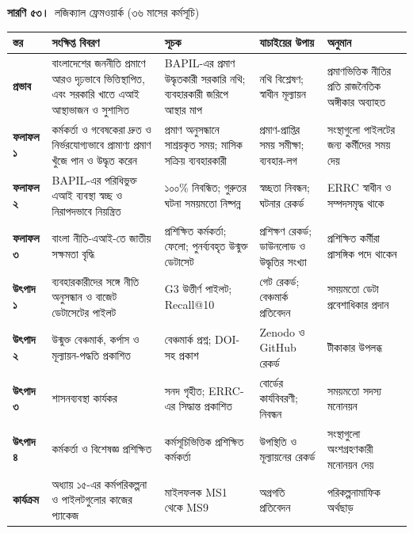 \documentclass[border=10pt]{standalone}
\begin{document}
\begin{minipage}{17cm}
{\large\bfseries সারণি ৫৩।}\ {\large লজিক্যাল ফ্রেমওয়ার্ক (৩৬ মাসের কর্মসূচি)}\par\vspace{7pt}
\small
{}
\begin{tabularx}{\linewidth}{@{}>{\hsize=0.592\hsize\raggedright\arraybackslash}X>{\hsize=1.232\hsize\raggedright\arraybackslash}X>{\hsize=1.232\hsize\raggedright\arraybackslash}X>{\hsize=0.900\hsize\raggedright\arraybackslash}X>{\hsize=1.043\hsize\raggedright\arraybackslash}X@{}}
\arrayrulecolor{bapilrule}\toprule
\rowcolor{white}\textbf{স্তর} & \textbf{সংক্ষিপ্ত বিবরণ} & \textbf{সূচক} & \textbf{যাচাইয়ের উপায়} & \textbf{অনুমান} \\
\midrule
\textbf{প্রভাব} & বাংলাদেশের জননীতি প্রমাণে আরও দৃঢ়ভাবে ভিত্তিস্থাপিত, এবং সরকারি খাতে এআই আস্থাভাজন ও সুশাসিত & BAPIL-এর প্রমাণ উদ্ধৃতকারী সরকারি নথি; ব্যবহারকারী জরিপে আস্থার মাপ & নথি বিশ্লেষণ; স্বাধীন মূল্যায়ন & প্রমাণভিত্তিক নীতির প্রতি রাজনৈতিক অঙ্গীকার অব্যাহত \\
\textbf{ফলাফল ১} & কর্মকর্তা ও গবেষকেরা দ্রুত ও নির্ভরযোগ্যভাবে প্রামাণ্য প্রমাণ খুঁজে পান ও উদ্ধৃত করেন & প্রমাণ অনুসন্ধানে সাশ্রয়কৃত সময়; মাসিক সক্রিয় ব্যবহারকারী & প্রমাণ-প্রাপ্তির সময় সমীক্ষা; ব্যবহার-লগ & সংস্থাগুলো পাইলটের জন্য কর্মীদের সময় দেয় \\
\textbf{ফলাফল ২} & BAPIL-এর পরিধিভুক্ত এআই ব্যবস্থা স্বচ্ছ ও নিরাপদভাবে নিয়ন্ত্রিত & ১০০\% নিবন্ধিত; গুরুতর ঘটনা সময়মতো নিষ্পন্ন & স্বচ্ছতা নিবন্ধন; ঘটনার রেকর্ড & ERRC স্বাধীন ও সম্পদসমৃদ্ধ থাকে \\
\textbf{ফলাফল ৩} & বাংলা নীতি-এআই-তে জাতীয় সক্ষমতা বৃদ্ধি & প্রশিক্ষিত কর্মকর্তা; ফেলো; পুনর্ব্যবহৃত উন্মুক্ত ডেটাসেট & প্রশিক্ষণ রেকর্ড; ডাউনলোড ও উদ্ধৃতির সংখ্যা & প্রশিক্ষিত কর্মীরা প্রাসঙ্গিক পদে থাকেন \\
\textbf{উৎপাদ ১} & ব্যবহারকারীদের সঙ্গে নীতি অনুসন্ধান ও বাজেট ডেটাসেটের পাইলট & G3 উত্তীর্ণ পাইলট; Recall@10 & গেট রেকর্ড; বেঞ্চমার্ক প্রতিবেদন & সময়মতো ডেটা প্রবেশাধিকার প্রদান \\
\textbf{উৎপাদ ২} & উন্মুক্ত বেঞ্চমার্ক, কর্পাস ও মূল্যায়ন-পদ্ধতি প্রকাশিত & বেঞ্চমার্ক প্রশ্ন; DOI-সহ প্রকাশ & Zenodo ও GitHub রেকর্ড & টীকাকার উপলব্ধ \\
\textbf{উৎপাদ ৩} & শাসনব্যবস্থা কার্যকর & সনদ গৃহীত; ERRC-এর সিদ্ধান্ত প্রকাশিত & বোর্ডের কার্যবিবরণী; নিবন্ধন & সময়মতো সদস্য মনোনয়ন \\
\textbf{উৎপাদ ৪} & কর্মকর্তা ও বিশেষজ্ঞ প্রশিক্ষিত & কর্মসূচিভিত্তিক প্রশিক্ষিত কর্মকর্তা & উপস্থিতি ও মূল্যায়নের রেকর্ড & সংস্থাগুলো অংশগ্রহণকারী মনোনয়ন দেয় \\
\textbf{কার্যক্রম} & অধ্যায় ১৫-এর কর্মপরিকল্পনা ও পাইলটগুলোর কাজের প্যাকেজ & মাইলফলক MS1 থেকে MS9 & অগ্রগতি প্রতিবেদন & পরিকল্পনামাফিক অর্থছাড় \\
\bottomrule
\end{tabularx}
\par{}
\end{minipage}
\end{document}
